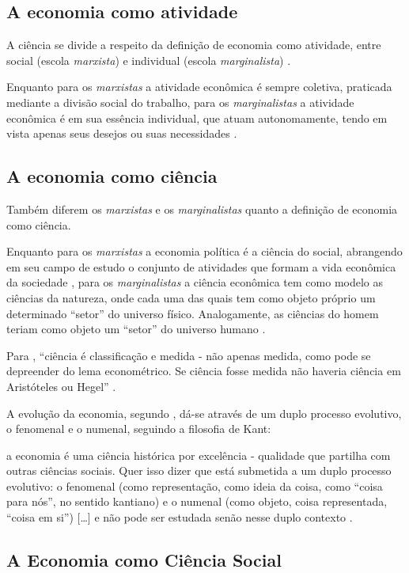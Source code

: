 \documentclass[
	12pt,				%
	oneside,			%
	a4paper,			%
	chapter=TITLE,		%
	section=TITLE,		%
	english,			%
	brazil				%
	]{abntex2}
\begin{document}
\hypertarget{a-economia-como-atividade}{%
\subsection{A economia como atividade}\label{a-economia-como-atividade}}

A ciência se divide a respeito da definição de economia como atividade, entre
social (escola \emph{marxista}) e individual (escola \emph{marginalista}) \autocite[9]{singer}.

Enquanto para os \emph{marxistas} a atividade econômica é sempre coletiva, praticada
mediante a divisão social do trabalho, para os \emph{marginalistas} a atividade
econômica é em sua essência individual, que atuam autonomamente, tendo em vista
apenas seus desejos ou suas necessidades \autocite[10]{singer}.

\hypertarget{a-economia-como-ciuxeancia}{%
\subsection{A economia como ciência}\label{a-economia-como-ciuxeancia}}

Também diferem os \emph{marxistas} e os \emph{marginalistas} quanto a definição de
economia como ciência.

Enquanto para os \emph{marxistas} a economia política é a ciência do social,
abrangendo em seu campo de estudo o conjunto de atividades que formam a vida
econômica da sociedade \autocite[14]{singer}, para os \emph{marginalistas} a
ciência econômica tem como modelo as ciências da natureza, onde cada uma das
quais tem como objeto próprio um determinado ``setor'' do universo físico.
Analogamente, as ciências do homem teriam como objeto um ``setor'' do universo
humano \autocite[15]{singer}.

Para \textcite{rangel1956}, ``ciência é classificação e medida - não apenas medida, como
pode se depreender do lema econométrico. Se ciência fosse medida não haveria
ciência em Aristóteles ou Hegel'' \autocite[204]{rangel1956}.

A evolução da economia, segundo \textcite{rangel1956}, dá-se através de um
duplo processo evolutivo, o fenomenal e o numenal, seguindo a filosofia de Kant:
\begin{citacao}
a economia é uma ciência histórica por excelência - qualidade que partilha com
outras ciências sociais. Quer isso dizer que está submetida a um duplo processo
evolutivo: o fenomenal (como representação, como ideia da coisa, como ``coisa
para nós'', no sentido kantiano) e o numenal (como objeto, coisa representada,
``coisa em si'') [\ldots] e não pode ser estudada senão nesse duplo contexto
\cite[p.~204]{rangel1956}.
\end{citacao}
\hypertarget{a-economia-como-ciuxeancia-social}{%
\subsection{A Economia como Ciência Social}\label{a-economia-como-ciuxeancia-social}}
\end{document}
